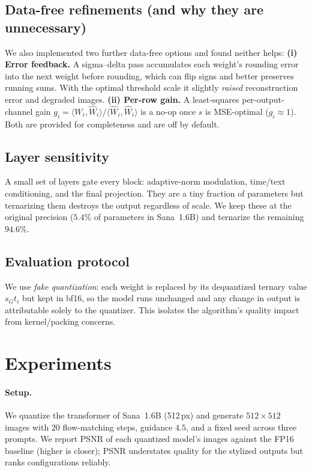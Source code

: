 \documentclass[11pt]{article}
\begin{document}
\subsection{Data-free refinements (and why they are unnecessary)}
We also implemented two further data-free options and found neither helps:
\textbf{(i) Error feedback.} A sigma–delta pass accumulates each weight's rounding
error into the next weight before rounding, which can flip signs and better
preserves running sums. With the optimal threshold scale it slightly \emph{raised}
reconstruction error and degraded images. \textbf{(ii) Per-row gain.} A
least-squares per-output-channel gain $g_i=\langle W_i,\hat W_i\rangle/\langle\hat
W_i,\hat W_i\rangle$ is a no-op once $s$ is MSE-optimal ($g_i\approx1$). Both are
provided for completeness and are off by default.

\subsection{Layer sensitivity}
A small set of layers gate every block: adaptive-norm modulation, time/text
conditioning, and the final projection. They are a tiny fraction of parameters but
ternarizing them destroys the output regardless of scale. We keep these at the
original precision ($5.4\%$ of parameters in Sana~1.6B) and ternarize the
remaining $94.6\%$.

\subsection{Evaluation protocol}
We use \emph{fake quantization}: each weight is replaced by its dequantized
ternary value $s_G t_i$ but kept in bf16, so the model runs unchanged and any
change in output is attributable solely to the quantizer. This isolates the
algorithm's quality impact from kernel/packing concerns.

\section{Experiments}
\label{sec:exp}
\paragraph{Setup.} We quantize the transformer of Sana~1.6B (512\,px) and generate
$512{\times}512$ images with $20$ flow-matching steps, guidance $4.5$, and a fixed
seed across three prompts. We report PSNR of each quantized model's images against
the FP16 baseline (higher is closer); PSNR understates quality for the stylized
outputs but ranks configurations reliably.
\end{document}
